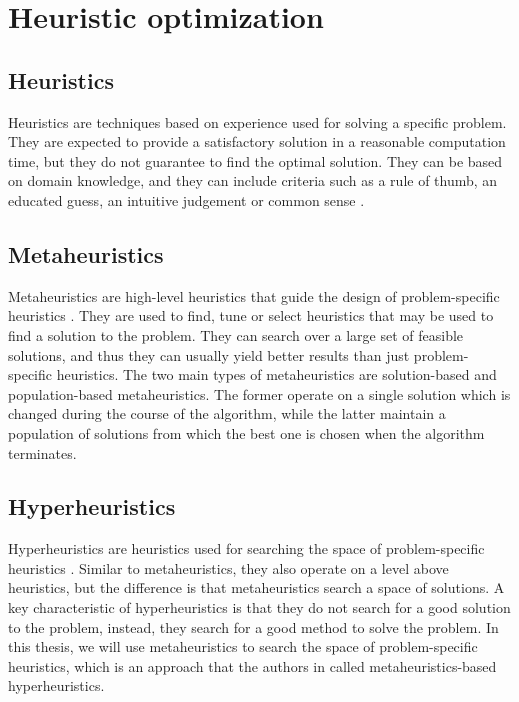 \section{Heuristic optimization}
\label{sec:heuristic_optimization}

\subsection{Heuristics}
\label{sec:heuristics}
Heuristics are techniques based on experience used for solving a specific problem. They are expected to provide a satisfactory solution in a reasonable computation time, but they do not guarantee to find the optimal solution. They can be based on domain knowledge, and they can include criteria such as a rule of thumb, an educated guess, an intuitive judgement or common sense \citep{swamy2016search}.

\subsection{Metaheuristics}
\label{sec:metaheuristics}
Metaheuristics are high-level heuristics that guide the design of problem-specific heuristics \citep{swamy2016search}. They are used to find, tune or select heuristics that may be used to find a solution to the problem. They can search over a large set of feasible solutions, and thus they can usually yield better results than just problem-specific heuristics. The two main types of metaheuristics are solution-based and population-based metaheuristics. The former operate on a single solution which is changed during the course of the algorithm, while the latter maintain a population of solutions from which the best one is chosen when the algorithm terminates.

\subsection{Hyperheuristics}
\label{sec:hyperheuristics}
Hyperheuristics are heuristics used for searching the space of problem-specific heuristics \citep{Chakhlevitch2008}. Similar to metaheuristics, they also operate on a level above heuristics, but the difference is that metaheuristics search a space of solutions. A key characteristic of hyperheuristics is that they do not search for a good solution to the problem, instead, they search for a good method to solve the problem. In this thesis, we will use metaheuristics to search the space of problem-specific heuristics, which is an approach that the authors in \citep{Chakhlevitch2008} called metaheuristics-based hyperheuristics.
